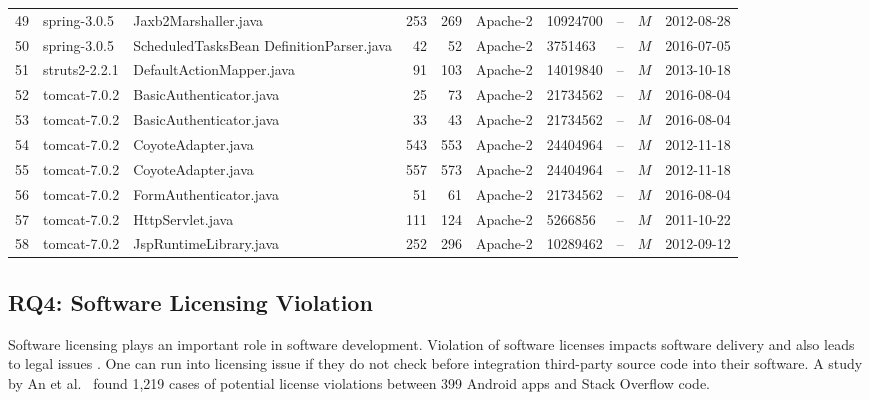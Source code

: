 \documentclass{sig-alternate-05-2015}
\begin{document}
\begin{table}
{\begin{tabular}{r|l|p{4.5cm}|r|r|l|l|l|c|l}
			49 & spring-3.0.5  & Jaxb2Marshaller.java  & 253 & 269 & Apache-2 & 10924700 & -- & $M$  & 2012-08-28 \\
			50 & spring-3.0.5  & ScheduledTasksBean \newline DefinitionParser.java  & 42 & 52 & Apache-2 & 3751463 & -- & $M$  & 2016-07-05 \\
			51 & struts2-2.2.1  & DefaultActionMapper.java  & 91 & 103 & Apache-2 & 14019840 & -- & $M$  & 2013-10-18 \\
			52 & tomcat-7.0.2  & BasicAuthenticator.java  & 25 & 73 & Apache-2 & 21734562 & -- & $M$  & 2016-08-04 \\
			53 & tomcat-7.0.2  & BasicAuthenticator.java  & 33 & 43 & Apache-2 & 21734562 & -- & $M$  & 2016-08-04 \\
			54 & tomcat-7.0.2  & CoyoteAdapter.java  & 543 & 553 & Apache-2 & 24404964 & -- & $M$  & 2012-11-18 \\
			55 & tomcat-7.0.2  & CoyoteAdapter.java  & 557 & 573 & Apache-2 & 24404964 & -- & $M$  & 2012-11-18 \\
			56 & tomcat-7.0.2  & FormAuthenticator.java  & 51 & 61 & Apache-2 & 21734562 & -- & $M$  & 2016-08-04 \\
			57 & tomcat-7.0.2  & HttpServlet.java  & 111 & 124 & Apache-2 & 5266856 & -- & $M$  & 2011-10-22 \\
			58 & tomcat-7.0.2  & JspRuntimeLibrary.java  & 252 & 296 & Apache-2 & 10289462 & -- & $M$  & 2012-09-12 \\
		\hline
	\end{tabular} %
}
\end{table}

\subsection{RQ4: Software Licensing Violation}
Software licensing plays an important role in software development. Violation of software licenses impacts software delivery and also leads to legal issues \cite{Sprigman2015}. 
One can run into licensing issue if they do not check before integration third-party source code into their software. A study by An et al.~\cite{An2017} found 1,219 cases of potential license violations between 399 Android apps and Stack Overflow code. %
\end{document}
